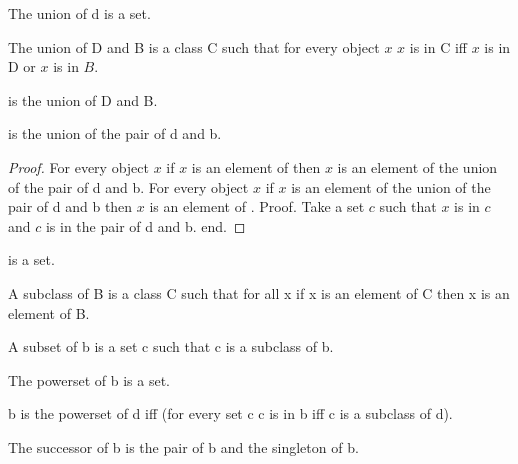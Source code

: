 \documentclass{article}
\begin{document}
\begin{forthel}
    \begin{axiom}[Union]
      The union of d is a set.
    \end{axiom}

    \begin{definition}
      The union of D and B is a class C such that for every object $x$
        $x$ is in C iff $x$ is in D or $x$ is in $B$.
    \end{definition}

    \begin{definition}
       is the union of D and B.
    \end{definition}

    \begin{lemma}
       is the union of the pair of d and b.
    \end{lemma}
    \begin{proof}
      For every object $x$ if $x$ is an element of 
        then $x$ is an element of the union of the pair of d and b.
      For every object $x$ if $x$ is an element of the union of the pair of d and b
        then $x$ is an element of .
      Proof.
        Take a set $c$ such that $x$ is in $c$ and $c$ is in the pair of d and b.
      end.
    \end{proof}

    \begin{lemma}
       is a set.
    \end{lemma}

    \begin{definition}
      A subclass of B is a class C such that
        for all x if x is an element of C then x is an element of B.
    \end{definition}

    \begin{definition}
      A subset of b is a set c 
        such that c is a subclass of b.
    \end{definition}

    \begin{signature}
      The powerset of b is a set.
    \end{signature}

    \begin{axiom}[PowerSet]
      b is the powerset of d iff (for every set c c is in b iff c is a subclass of d).
    \end{axiom}

    \begin{definition}
      The successor of b is the pair of b and the singleton of b.
    \end{definition}


\end{forthel}
\end{document}
